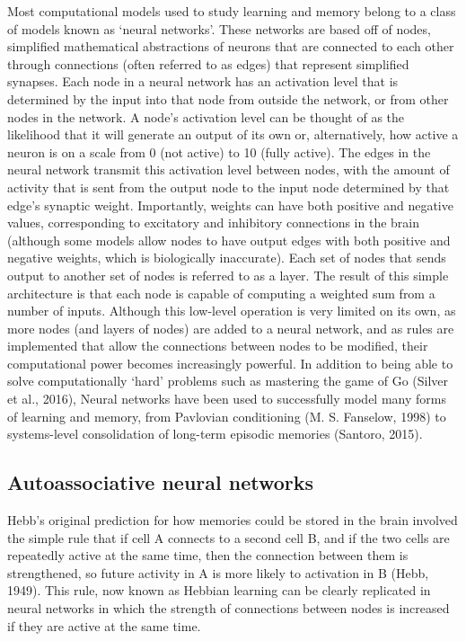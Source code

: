 \documentclass[12pt,a4paper,]{report}
\begin{document}
Most computational models used to study learning and memory belong to a
class of models known as `neural networks'. These networks are based off
of nodes, simplified mathematical abstractions of neurons that are
connected to each other through connections (often referred to as edges)
that represent simplified synapses. Each node in a neural network has an
activation level that is determined by the input into that node from
outside the network, or from other nodes in the network. A node's
activation level can be thought of as the likelihood that it will
generate an output of its own or, alternatively, how active a neuron is
on a scale from 0 (not active) to 10 (fully active). The edges in the
neural network transmit this activation level between nodes, with the
amount of activity that is sent from the output node to the input node
determined by that edge's synaptic weight. Importantly, weights can have
both positive and negative values, corresponding to excitatory and
inhibitory connections in the brain (although some models allow nodes to
have output edges with both positive and negative weights, which is
biologically inaccurate). Each set of nodes that sends output to another
set of nodes is referred to as a layer. The result of this simple
architecture is that each node is capable of computing a weighted sum
from a number of inputs. Although this low-level operation is very
limited on its own, as more nodes (and layers of nodes) are added to a
neural network, and as rules are implemented that allow the connections
between nodes to be modified, their computational power becomes
increasingly powerful. In addition to being able to solve
computationally `hard' problems such as mastering the game of Go (Silver
et al., 2016), Neural networks have been used to successfully model many
forms of learning and memory, from Pavlovian conditioning (M. S.
Fanselow, 1998) to systems-level consolidation of long-term episodic
memories (Santoro, 2015).

\subsection{Autoassociative neural
networks}\label{autoassociative-neural-networks}

Hebb's original prediction for how memories could be stored in the brain
involved the simple rule that if cell A connects to a second cell B, and
if the two cells are repeatedly active at the same time, then the
connection between them is strengthened, so future activity in A is more
likely to activation in B (Hebb, 1949). This rule, now known as Hebbian
learning can be clearly replicated in neural networks in which the
strength of connections between nodes is increased if they are active at
the same time.
\end{document}
